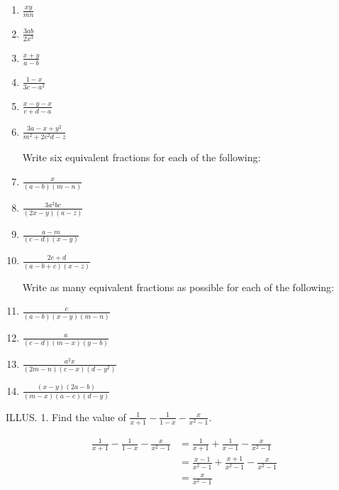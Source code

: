 \documentclass{book}
\begin{document}
\begin{enumerate}
\item $\displaystyle \frac{xy}{mn}$

\item $\displaystyle \frac{3ab}{2x^3}$

\item $\displaystyle \frac{x+y}{a-b}$

\item $\displaystyle \frac{1-x}{3c-a^2}$

\item $\displaystyle \frac{x-y-x}{c+d-a}$

\item $\displaystyle \frac{3a-x+y^2}{m^2+2c^2d-z}$

Write six equivalent fractions for each of the following:

\item $\displaystyle \frac{x}{(a-b)(m-n)}$

\item $\displaystyle \frac{3a^2bc}{(2x-y)(a-z)}$

\item $\displaystyle \frac{a-m}{(c-d)(x-y)}$

\item $\displaystyle \frac{2c+d}{(a-b+c)(x-z)}$

Write as many equivalent fractions as possible for
each of the following:

\item $\displaystyle \frac{c}{(a-b)(x-y)(m-n)}$

\item $\displaystyle \frac{a}{(c-d)(m-x)(y-b)}$

\item $\displaystyle \frac{a^2x}{(2m-n)(c-x)(d-y^2)}$

\item $\displaystyle \frac{(x-y)(2a-b)}{(m-x)(a-c)(d-y)}$
\end{enumerate}

ILLUS. 1. Find the value of $\frac{1}{x+1}-\frac{1}{1-x}-\frac{x}{x^2-1}$.

\[
\begin{array}{rl}\displaystyle
\frac{1}{x+1}-\frac{1}{1-x}-\frac{x}{x^2-1}
&\displaystyle = \frac{1}{x+1}+\frac{1}{x-1}-\frac{x}{x^2-1}\\
&\displaystyle = \frac{x-1}{x^2-1}+\frac{x+1}{x^2-1}-\frac{x}{x^2-1}\\
&\displaystyle = \frac{x}{x^2-1}
\end{array}
\]
\end{document}

